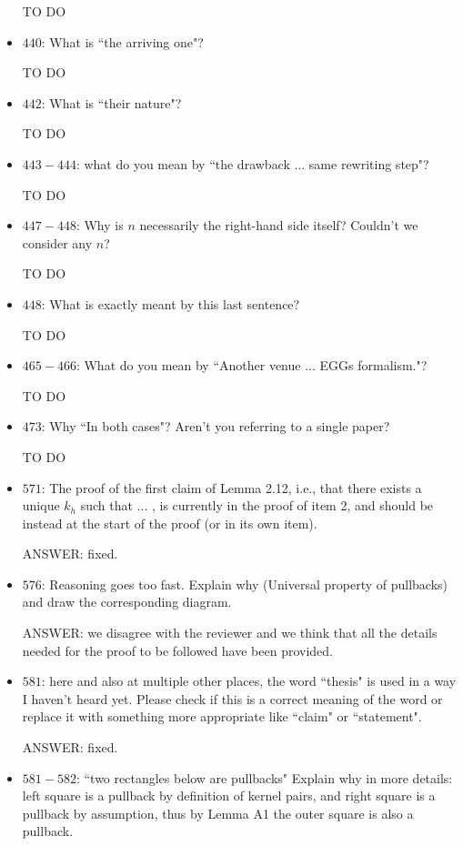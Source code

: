 \documentclass[english,11pt,a4paper]{article}
\begin{document}
\begin{itemize}
TO DO

\item $440$: What is ``the arriving one"?

TO DO
\item $442$: What is ``their nature"?

TO DO
\item $443-444$: what do you mean by ``the drawback ... same rewriting step"?

TO DO

\item $447-448$: Why is $n$ necessarily the right-hand side itself? Couldn't we consider any $n$?

TO DO

\item $448$: What is exactly meant by this last sentence?

TO DO

\item $465-466$: What do you mean by ``Another venue ... EGGs formalism."?

TO DO

\item $473$: Why ``In both cases"? Aren't you referring to a single paper? 

TO DO

\item $571$: The proof of the first claim of Lemma 2.12, i.e., that there exists a unique $k_h$ such that ... , is currently in the proof of item 2, and should be instead at the start of the proof (or in its own item).

ANSWER: fixed.



\item $576$: Reasoning goes too fast. Explain why (Universal property of pullbacks) and draw the corresponding diagram.

ANSWER: we disagree with the reviewer and we think that all the details needed for the proof to be followed have been provided. 

\item $581$: here and also at multiple other places, the word ``thesis" is used in a way I haven't heard yet. Please check if this is a correct meaning of the word or replace it with something more appropriate like ``claim" or ``statement".

ANSWER: fixed. 

\item $581-582$: ``two rectangles below are pullbacks" Explain why in more details: left square is a pullback by definition of kernel pairs, and right square is a pullback by assumption, thus by Lemma A1 the outer square is also a pullback.


\end{itemize}
\end{document}
